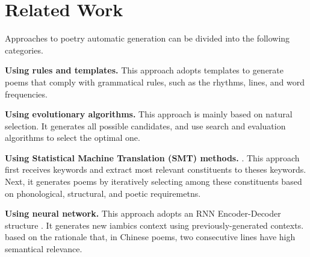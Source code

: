 \section{Related Work}  
%
Approaches to poetry automatic generation can be divided into the following categories.

\textbf{Using rules and templates.}
%
This approach adopts templates to generate poems that comply with grammatical rules, such as the rhythms, lines, and word frequencies\cite{wu2009new,tosa2008hitch}. 

\textbf {Using evolutionary algorithms.} This approach is mainly based on natural selection. It generates all possible candidates, and use search and evaluation algorithms to select the optimal one\cite{manurung2004evolutionary,manurung2012using}.
%

\textbf{Using Statistical Machine Translation (SMT) methods.}
\cite{jiang2008generating}. This approach first receives keywords and extract most relevant constituents to theses keywords.  Next, it generates poems by iteratively selecting among these constituents based on phonological,
structural, and poetic requiremetns.

\textbf{Using neural network.}  This approach adopts an RNN Encoder-Decoder structure \cite{wang2016chinese,bahdanau2014neural}. 
%
It generates new iambics context using previously-generated contexts. based on the rationale  that, in Chinese poems, two consecutive lines have high semantical relevance.
  